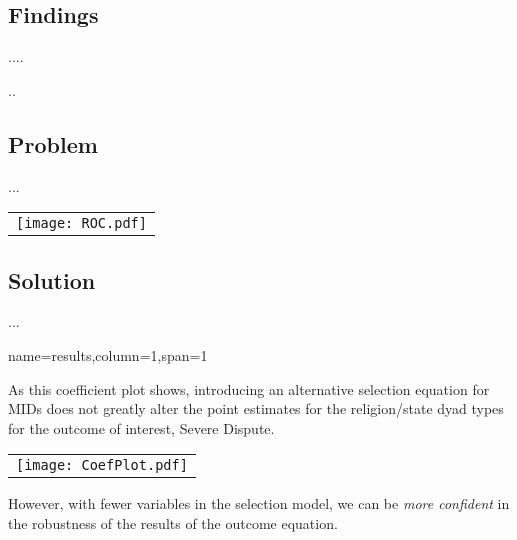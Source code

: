 \documentclass[landscape,paperheight=24in,fontscale=.45,paperwidth=36in,landscape,final]{baposter}
\begin{document}
\begin{poster}
{\subsection*{Findings}
....
}
%
%
{
..
\vspace{-3mm}
\subsection*{Problem}
...
\vspace{-9mm}
\begin{center}
\begin{tabular}{l}
 \\ [2.0ex]
\texttt{[image: ROC.pdf]}
\end{tabular}
\end{center}
\vspace{-11mm} 
\subsection*{Solution}
...
}



{name=results,column=1,span=1}
{
As this coefficient plot shows, introducing an alternative selection equation for MIDs does not greatly alter the point estimates for the religion/state dyad types for the outcome of interest, Severe Dispute.
\vspace{-9mm}
\begin{center}
\begin{tabular}{l}
 \\ [2.0ex]
\texttt{[image: CoefPlot.pdf]}
\end{tabular}
\end{center}
\vspace{-4mm}
However, with fewer variables in the selection model, we can be \emph{more confident} in the robustness of the results of the outcome equation.
}



\end{poster}
\end{document}
